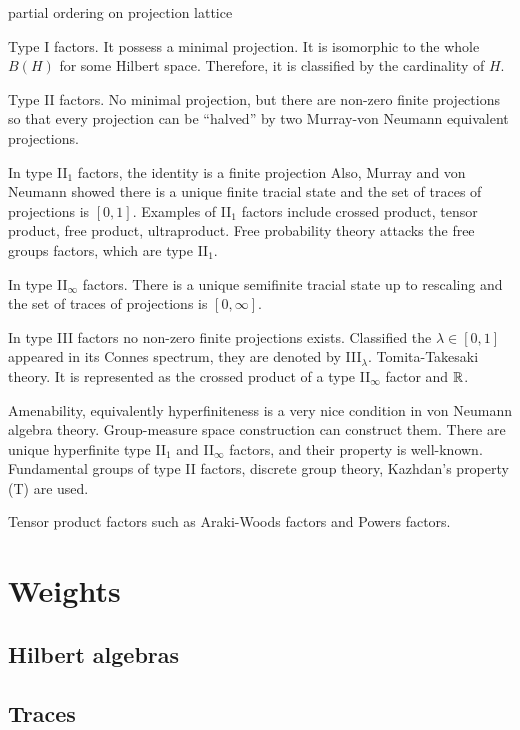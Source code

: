 \documentclass{../../large}
\begin{document}
partial ordering on projection lattice

Type I factors.
It possess a minimal projection.
It is isomorphic to the whole $B(H)$ for some Hilbert space.
Therefore, it is classified by the cardinality of $H$.

Type II factors.
No minimal projection, but there are non-zero finite projections so that every projection can be ``halved'' by two Murray-von Neumann equivalent projections.

In type II$_1$ factors, the identity is a finite projection
Also, Murray and von Neumann showed there is a unique finite tracial state and the set of traces of projections is $[0,1]$.
Examples of II$_1$ factors include crossed product, tensor product, free product, ultraproduct.
Free probability theory attacks the free groups factors, which are type II$_1$.

In type II$_\infty$ factors.
There is a unique semifinite tracial state up to rescaling and the set of traces of projections is $[0,\infty]$.

In type III factors no non-zero finite projections exists.
Classified the $\lambda\in[0,1]$ appeared in its Connes spectrum, they are denoted by III$_\lambda$.
Tomita-Takesaki theory.
It is represented as the crossed product of a type II$_\infty$ factor and $\mathbb{R}$.

Amenability, equivalently hyperfiniteness is a very nice condition in von Neumann algebra theory.
Group-measure space construction can construct them.
There are unique hyperfinite type II$_1$ and II$_\infty$ factors, and their property is well-known.
Fundamental groups of type II factors, discrete group theory, Kazhdan's property (T) are used.

Tensor product factors such as Araki-Woods factors and Powers factors.




\chapter{Weights}

\section{Hilbert algebras}






\section{Traces}
\end{document}
